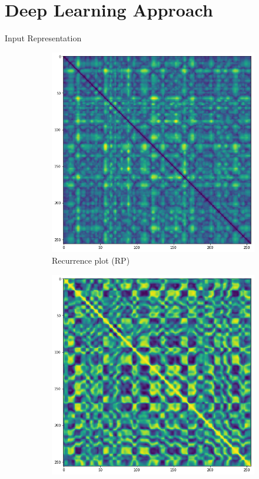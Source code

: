 \documentclass{beamer}
\begin{document}

\section{Deep Learning Approach}


\begin{frame}{Input Representation}
\begin{figure}
\centering
\begin{subfigure}{.5\textwidth}
  \centering
  \includegraphics[width=.9\linewidth]{./Images/chebyshev.png}
  \caption{Recurrence plot (RP)}
\end{subfigure}%
\begin{subfigure}{.5\textwidth}
  \centering
  \includegraphics[width=.9\linewidth]{./Images/cs.png}

\end{subfigure}
\end{figure}
\end{frame}
\end{document}

